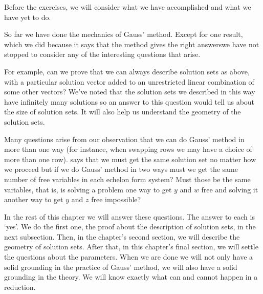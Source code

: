 Before the exercises, we will consider what we have accomplished  
and what we have yet to do.

So far we have done the mechanics of Gauss' method.
Except for one result, \Dash which 
we did because
it says that the method gives the right answers\Dash we 
have not stopped to consider any of the interesting questions
that arise.

For example, can we prove that we can 
always describe solution sets as above, with
a particular solution vector added to an unrestricted linear combination of 
some other vectors?
We've noted that the solution sets we described in this way 
have infinitely many solutions
so an answer to this question
would tell us about the size of solution sets.
It will also help us understand the geometry of the solution
sets.

Many questions arise from our observation that we can do Gauss' method in 
more than one way (for instance, when swapping rows we may have a choice of 
more than one row).
 says that we must get the same solution set
no matter how we proceed but
if we do Gauss' method in two ways
must we get the same number of free variables in each echelon form system?
Must those be the same variables, that is, is
solving a problem
one way to get $y$ and $w$ free and solving it another way to get $y$ and
$z$ free impossible?

In the rest of this chapter we will answer these questions.
The answer to each is `yes'.
We do the first one, the proof about the description of solution sets, 
in the next subsection.
Then, in the chapter's second section, 
we will describe the geometry of solution sets.
After that, in this chapter's final section,
we will settle the questions
about the parameters. 
When we are done we will not only have a 
solid grounding in the practice of Gauss' method, 
we will also have a solid grounding in the theory.
We will know exactly what can and cannot happen in a reduction.


